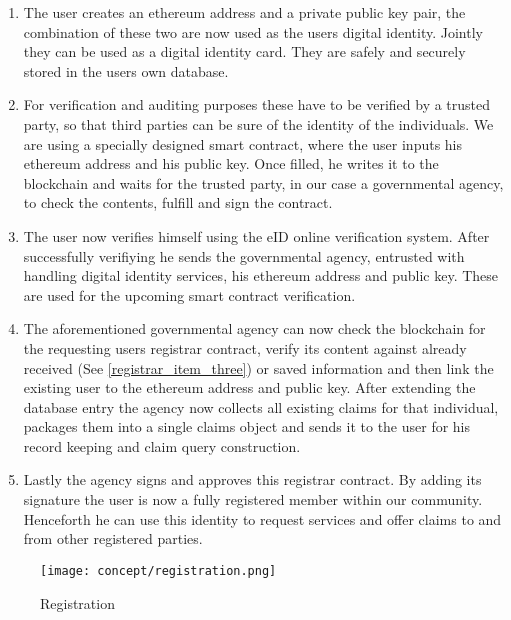 \begin{enumerate}
\item \label{registrar_item_one}
The user creates an ethereum address and a private public key pair, the combination of these two are now used as the users digital identity. Jointly they can be used as a digital identity card. They are safely and securely stored in the users own database.
\item \label{registrar_item_two}
For verification and auditing purposes these have to be verified by a trusted party, so that third parties can be sure of the identity of the individuals. We are using a specially designed smart contract, where the user inputs his ethereum address and his public key. Once filled, he writes it to the blockchain and waits for the trusted party, in our case a governmental agency, to check the contents, fulfill and sign the contract.
\item \label{registrar_item_three}
The user now verifies himself using the eID online verification system. After successfully verifiying he sends the governmental agency, entrusted with handling digital identity services, his ethereum address and public key. These are used for the upcoming smart contract verification.
\begin{comment}
DONT NEED: The user can now have his ethereum address and private public key pair verified by a governmental agency.
\end{comment}
\item \label{registrar_item_four}
The aforementioned governmental agency can now check the blockchain for the requesting users registrar contract, verify its content against already received (See \ref{registrar_item_three}) or saved information and then link the existing user to the ethereum address and public key. After extending the database entry the agency now collects all existing claims for that individual, packages them into a single claims object and sends it to the user for his record keeping and claim query construction.  
\item \label{registrar_item_five}
Lastly the agency signs and approves this registrar contract. By adding its signature the user is now a fully registered member within our community. Henceforth he can use this identity to request services and offer claims to and from other registered parties. 
\end{enumerate}

\begin{figure}[ht]
\centering
\texttt{[image: concept/registration.png]}
\caption{Registration}
\label{fig:registration_concept}
\end{figure}

